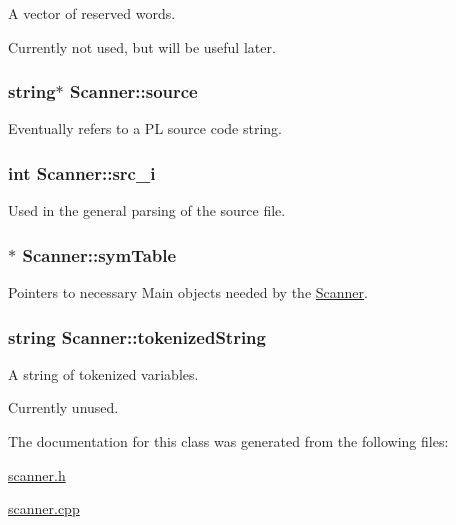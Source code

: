 A vector of reserved words. 

Currently not used, but will be useful later. \hypertarget{classScanner_ab440d28734316634c3e957771468e7db}{
\subsubsection[{source}]{\setlength{\rightskip}{0pt plus 5cm}string$\ast$ {\bf Scanner::source}}}
\label{classScanner_ab440d28734316634c3e957771468e7db}


Eventually refers to a PL source code string. 

\hypertarget{classScanner_ae8004b082846221da9bbd8affc02bf2b}{
\subsubsection[{src\_\-i}]{\setlength{\rightskip}{0pt plus 5cm}int {\bf Scanner::src\_\-i}}}
\label{classScanner_ae8004b082846221da9bbd8affc02bf2b}


Used in the general parsing of the source file. 

\hypertarget{classScanner_a9b0471200485b0ab6d368c93ad718229}{
\subsubsection[{symTable}]{$\ast$ {\bf Scanner::symTable}}}
\label{classScanner_a9b0471200485b0ab6d368c93ad718229}


Pointers to necessary Main objects needed by the \hyperlink{classScanner}{Scanner}. 

\hypertarget{classScanner_ab9502fbbd4851a25aec126093247ec6e}{
\subsubsection[{tokenizedString}]{\setlength{\rightskip}{0pt plus 5cm}string {\bf Scanner::tokenizedString}}}
\label{classScanner_ab9502fbbd4851a25aec126093247ec6e}


A string of tokenized variables. 

Currently unused. 

The documentation for this class was generated from the following files:\begin{DoxyCompactItemize}
\item 
\hyperlink{scanner_8h}{scanner.h}\item 
\hyperlink{scanner_8cpp}{scanner.cpp}\end{DoxyCompactItemize}
